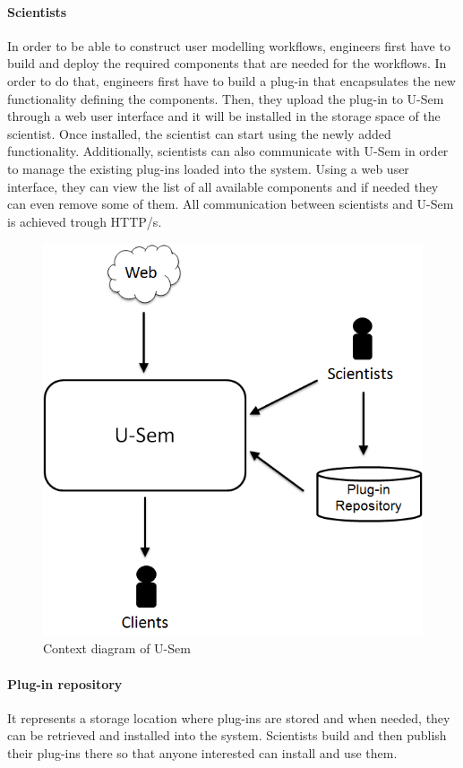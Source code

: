 \paragraph{Scientists}
In order to be able to construct user modelling workflows, engineers first have to build and deploy the required components that are needed for the workflows. In order to do that, engineers first have to build a plug-in that encapsulates the new functionality defining the components. Then, they upload the plug-in to U-Sem through a web user interface and it will be installed in the storage space of the scientist. Once installed, the scientist can start using the newly added functionality. Additionally, scientists can also communicate with U-Sem in order to manage the existing plug-ins loaded into the system. Using a web user interface, they can view the list of all available components and if needed they can even remove some of them. All communication between scientists and U-Sem is achieved trough HTTP/s.

\begin{figure}[h!]
  \centering
  	\includegraphics[scale=0.5]{plug-in/environment/runtime_env.png}
  \caption{Context diagram of U-Sem }
  \label{fig_context}
\end{figure}

\paragraph{Plug-in repository}
It represents a storage location where plug-ins are stored and when needed, they can be retrieved and installed into the system. Scientists build and then publish their plug-ins there so that anyone interested can install and use them. 


